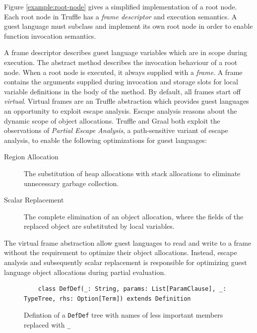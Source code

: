 Figure \ref{example:root-node} gives a simplified implementation of a root node.
Each root node in Truffle has a \textit{frame descriptor} and execution semantics.
A guest language must subclass and implement its own root node in order to enable function invocation semantics.

A frame descriptor describes guest language variables which are in scope during execution.
The abstract  method describes the invocation behaviour of a root node.
When a root node is executed, it always supplied with a \textit{frame}.
A frame contains the arguments supplied during invocation and storage slots for local variable definitions in the body of the method.
By default, all frames start off \textit{virtual}.
Virtual frames are an Truffle abstraction which provides guest languages an opportunity to exploit escape analysis.
Escape analysis\cite{escape-analysis} reasons about the dynamic scope of object allocations. 
Truffle and Graal both exploit the observations of \textit{Partial Escape Analysis}\cite{java:partial-escape-analysis}, a path-sensitive variant of escape analysis, to enable the following optimizations for guest languages:

\begin{description}
	\item[Region Allocation\cite{java:escape-analysis}\cite{tofte:region-memory}] The substitution of heap allocations with stack allocations to eliminate unnecessary garbage collection.
	\item[Scalar Replacement\cite{java:escape-analysis-optimizations}] The complete elimination of an object allocation, where the fields of the replaced object are substituted by local variables.
\end{description}

The virtual frame abstraction allow guest languages to read and write to a frame without the requirement to optimize their object allocations.
Instead, escape analysis and subsequently scalar replacement is responsible for optimizing guest language object allocations during partial evaluation. 

\begin{figure}[!htb]
	\begin{verbatim}
	class DefDef(_: String, params: List[ParamClause], _: TypeTree, rhs: Option[Term]) extends Definition	
	\end{verbatim}
	\caption{Defintion of a \texttt{DefDef} tree with names of less important members replaced with \texttt{\_}}
	\label{recall:defdef}
\end{figure}

